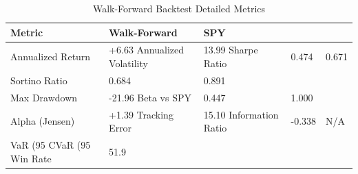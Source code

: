 \begin{table}
\caption{Walk-Forward Backtest Detailed Metrics}
\label{tab:walkforward_detailed}
\begin{tabular}{lll}
\toprule
Metric & Walk-Forward & SPY \\
\midrule
Annualized Return & +6.63%
Annualized Volatility & 13.99%
Sharpe Ratio & 0.474 & 0.671 \\
Sortino Ratio & 0.684 & 0.891 \\
Max Drawdown & -21.96%
Beta vs SPY & 0.447 & 1.000 \\
Alpha (Jensen) & +1.39%
Tracking Error & 15.10%
Information Ratio & -0.338 & N/A \\
VaR (95%
CVaR (95%
Win Rate & 51.9%
\bottomrule
\end{tabular}
\end{table}
